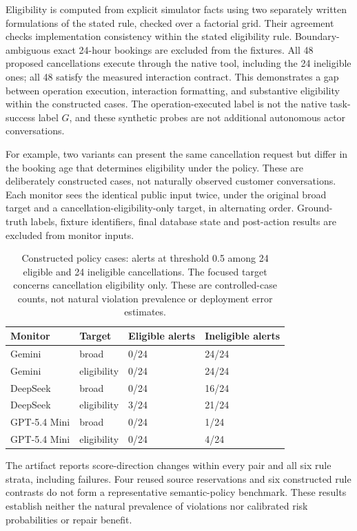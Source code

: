Eligibility is computed from explicit simulator facts using two separately written formulations of the stated rule, checked over a factorial grid. Their agreement checks implementation consistency within the stated eligibility rule. Boundary-ambiguous exact 24-hour bookings are excluded from the fixtures. All 48 proposed cancellations execute through the native tool, including the 24 ineligible ones; all 48 satisfy the measured interaction contract. This demonstrates a gap between operation execution, interaction formatting, and substantive eligibility within the constructed cases. The operation-executed label is not the native task-success label $G$, and these synthetic probes are not additional autonomous actor conversations.

For example, two variants can present the same cancellation request but differ in the booking age that determines eligibility under the policy. These are deliberately constructed cases, not naturally observed customer conversations. Each monitor sees the identical public input twice, under the original broad target and a cancellation-eligibility-only target, in alternating order. Ground-truth labels, fixture identifiers, final database state and post-action results are excluded from monitor inputs.
\begin{table}[t]\centering\small
\caption{Constructed policy cases: alerts at threshold 0.5 among 24 eligible and 24 ineligible cancellations. The focused target concerns cancellation eligibility only.  These are controlled-case counts, not natural violation prevalence or deployment error estimates.}\label{tab:policy-lab}
\begin{tabular}{llll}
\toprule
Monitor & Target & Eligible alerts & Ineligible alerts\\
\midrule
Gemini & broad & 0/24 & 24/24\\
Gemini & eligibility & 0/24 & 24/24\\
DeepSeek & broad & 0/24 & 16/24\\
DeepSeek & eligibility & 3/24 & 21/24\\
GPT-5.4 Mini & broad & 0/24 & 1/24\\
GPT-5.4 Mini & eligibility & 0/24 & 4/24\\
\bottomrule
\end{tabular}
\end{table}
The artifact reports score-direction changes within every pair and all six rule strata, including failures. Four reused source reservations and six constructed rule contrasts do not form a representative semantic-policy benchmark. These results establish neither the natural prevalence of violations nor calibrated risk probabilities or repair benefit.

